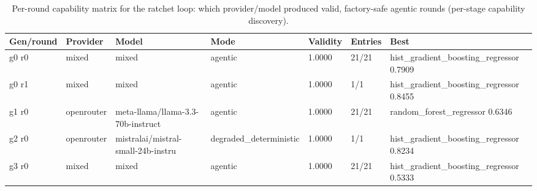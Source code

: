 \begin{table}[H]
\centering\small
\caption{Per-round capability matrix for the ratchet loop: which provider/model produced valid, factory-safe agentic rounds (per-stage capability discovery).}
\label{tab:ratchet-rounds-ratchet-ledger-california-housing}
\begin{tabular}{lllllll}
\toprule
Gen/round & Provider & Model & Mode & Validity & Entries & Best \\
\midrule
g0 r0 & mixed & mixed & agentic & 1.0000 & 21/21 & hist\_gradient\_boosting\_regressor 0.7909 \\
g0 r1 & mixed & mixed & agentic & 1.0000 & 1/1 & hist\_gradient\_boosting\_regressor 0.8455 \\
g1 r0 & openrouter & meta-llama/llama-3.3-70b-instruct & agentic & 1.0000 & 21/21 & random\_forest\_regressor 0.6346 \\
g2 r0 & openrouter & mistralai/mistral-small-24b-instru & degraded\_deterministic & 1.0000 & 1/1 & hist\_gradient\_boosting\_regressor 0.8234 \\
g3 r0 & mixed & mixed & agentic & 1.0000 & 21/21 & hist\_gradient\_boosting\_regressor 0.5333 \\
\bottomrule
\end{tabular}
\end{table}
